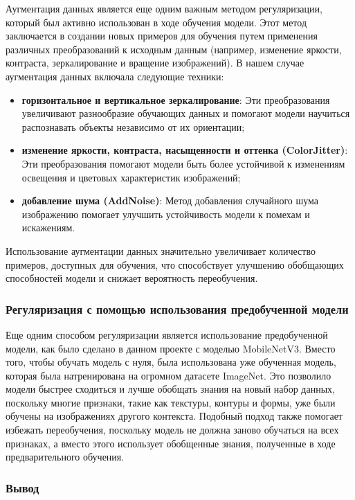 {    Аугментация данных является еще одним важным методом регуляризации, который был активно использован в ходе обучения модели. Этот метод заключается в создании новых примеров для обучения путем применения различных преобразований к исходным данным (например, изменение яркости, контраста, зеркалирование и вращение изображений). В нашем случае аугментация данных включала следующие техники:
    \begin{itemize}
        \item \textbf{горизонтальное и вертикальное зеркалирование}: Эти преобразования увеличивают разнообразие обучающих данных и помогают модели научиться распознавать объекты независимо от их ориентации;
        \item \textbf{изменение яркости, контраста, насыщенности и оттенка  (ColorJitter)}: Эти преобразования помогают модели быть более устойчивой к изменениям освещения и цветовых характеристик изображений;
        \item \textbf{добавление шума (AddNoise)}: Метод добавления случайного шума изображению помогает улучшить устойчивость модели к помехам и искажениям.
    \end{itemize}

    Использование аугментации данных значительно увеличивает количество примеров, доступных для обучения, что способствует улучшению обобщающих способностей модели и снижает вероятность переобучения.

    \subsubsection*{Регуляризация с помощью использования предобученной модели}

    Еще одним способом регуляризации является использование предобученной модели, как было сделано в данном проекте с моделью MobileNetV3. Вместо того, чтобы обучать модель с нуля, была использована уже обученная модель, которая была натренирована на огромном датасете ImageNet. Это позволило модели быстрее сходиться и лучше обобщать знания на новый набор данных, поскольку многие признаки, такие как текстуры, контуры и формы, уже были обучены на изображениях другого контекста. Подобный подход также помогает избежать переобучения, поскольку модель не должна заново обучаться на всех признаках, а вместо этого использует обобщенные знания, полученные в ходе предварительного обучения.

    \subsubsection*{Вывод}

}

